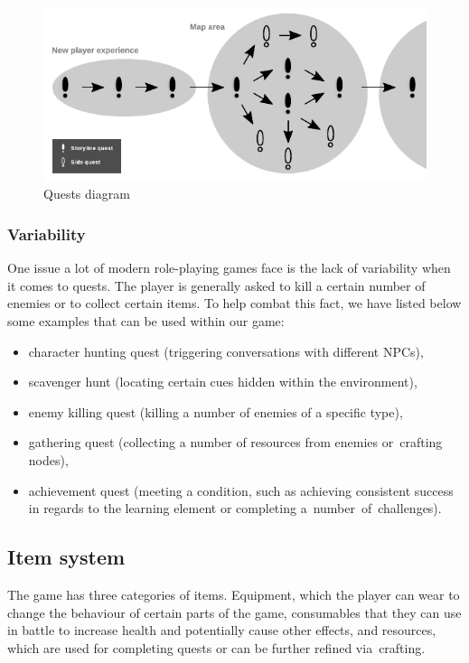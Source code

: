 \documentclass[thesis=B,english,hidelinks]{FITthesisXE}[2012/06/26]
\begin{document}
\begin{figure}[ht]
\centering
\includegraphics[scale=1.3]{diagram_quests}
\caption{Quests diagram}
\label{fig:diagram_quests}
\end{figure}

\subsubsection{Variability}

One issue a lot of modern role-playing games face is the lack of variability when it comes to quests. The player is generally asked to kill a certain number of enemies or to collect certain items. To help combat this fact, we have listed below some examples that can be used within our game:

\begin{itemize}
\item character hunting quest (triggering conversations with different NPCs),
\item scavenger hunt (locating certain cues hidden within the environment),
\item enemy killing quest (killing a number of enemies of a specific type),
\item gathering quest (collecting a number of resources from enemies or~crafting nodes),
\item achievement quest (meeting a condition, such as achieving consistent success in regards to the learning element or completing a~number~of~challenges).
\end{itemize}

\newpage

\subsection{Item system}

The game has three categories of items. Equipment, which the player can wear to change the behaviour of certain parts of the game, consumables that they can use in battle to increase health and potentially cause other effects, and resources, which are used for completing quests or can be further refined via~crafting.
\end{document}
